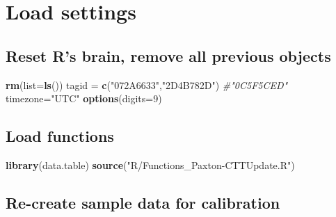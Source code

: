 \documentclass[
]{book}
\newenvironment{Shaded}{\begin{snugshade}}{\end{snugshade}}
\newcommand{\AttributeTok}[1]{\textcolor[rgb]{0.13,0.29,0.53}{#1}}
\newcommand{\CommentTok}[1]{\textcolor[rgb]{0.56,0.35,0.01}{\textit{#1}}}
\newcommand{\DecValTok}[1]{\textcolor[rgb]{0.00,0.00,0.81}{#1}}
\newcommand{\FunctionTok}[1]{\textcolor[rgb]{0.13,0.29,0.53}{\textbf{#1}}}
\newcommand{\NormalTok}[1]{#1}
\newcommand{\OtherTok}[1]{\textcolor[rgb]{0.56,0.35,0.01}{#1}}
\newcommand{\StringTok}[1]{\textcolor[rgb]{0.31,0.60,0.02}{#1}}
\begin{document}
\section{Load settings}\label{load-settings-4}

\subsection{Reset R's brain, remove all previous objects}\label{reset-rs-brain-remove-all-previous-objects}

\begin{Shaded}
\begin{Highlighting}[]
\FunctionTok{rm}\NormalTok{(}\AttributeTok{list=}\FunctionTok{ls}\NormalTok{())}
\NormalTok{tagid }\OtherTok{=} \FunctionTok{c}\NormalTok{(}\StringTok{"072A6633"}\NormalTok{,}\StringTok{"2D4B782D"}\NormalTok{) }\CommentTok{\#"0C5F5CED"}
\NormalTok{timezone}\OtherTok{=}\StringTok{"UTC"}
\FunctionTok{options}\NormalTok{(}\AttributeTok{digits=}\DecValTok{9}\NormalTok{)}
\end{Highlighting}
\end{Shaded}

\subsection{Load functions}\label{load-functions-2}

\begin{Shaded}
\begin{Highlighting}[]
\FunctionTok{library}\NormalTok{(data.table)}
\FunctionTok{source}\NormalTok{(}\StringTok{"R/Functions\_Paxton{-}CTTUpdate.R"}\NormalTok{)}
\end{Highlighting}
\end{Shaded}

\subsection{Re-create sample data for calibration}\label{re-create-sample-data-for-calibration}
\end{document}

